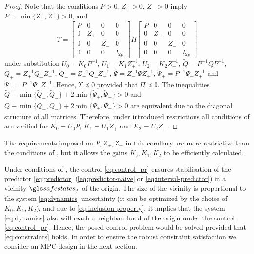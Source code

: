 \begin{proof}
	Note that the conditions $P>0$, $Z_{+}>0$, $Z_{-}>0$ imply $P+\min\{Z_{+},Z_{-}\}>0$,
	and 
	\[
	\Upsilon=\left[\begin{array}{cccc}
	P & 0 & 0 & 0\\
	0 & Z_{+} & 0 & 0\\
	0 & 0 & Z_{-} & 0\\
	0 & 0 & 0 & I_{2p}
	\end{array}\right]\Pi\left[\begin{array}{cccc}
	P & 0 & 0 & 0\\
	0 & Z_{+} & 0 & 0\\
	0 & 0 & Z_{-} & 0\\
	0 & 0 & 0 & I_{2p}
	\end{array}\right]
	\]
	under substitution $U_{0}=K_{0}P^{-1}$, $U_{1}=K_{1}Z_{+}^{-1}$,
	$U_{2}=K_{2}Z_{-}^{-1}$, $\tilde{Q}=P^{-1}QP^{-1}$, $\tilde{Q}_{+}=Z_{+}^{-1}Q_{+}Z_{+}^{-1}$,
	$\tilde{Q}_{-}=Z_{-}^{-1}Q_{-}Z_{-}^{-1}$, $\tilde{\Psi}=Z_{-}^{-1}\Psi Z_{+}^{-1}$,
	$\tilde{\Psi}_{+}=P^{-1}\Psi_{+}Z_{+}^{-1}$ and $\tilde{\Psi}_{-}=P^{-1}\Psi_{-}Z_{-}^{-1}$.
	Hence, $\Upsilon\preceq0$ provided that $\Pi\preceq0$. The inequalities
	$\tilde{Q}+\min\{\tilde{Q}_{+},\tilde{Q}_{-}\}+2\min\{\tilde{\Psi}_{+},\tilde{\Psi}_{-}\}>0$
	and $Q+\min\{Q_{+},Q_{-}\}+2\min\{\Psi_{+},\Psi_{-}\}>0$ are equivalent
	due to the diagonal structure of all matrices. Therefore, under introduced
	restrictions all conditions of  are verified
	for $K_{0}=U_{0}P$, $K_{1}=U_{1}Z_{+}$ and $K_{2}=U_{2}Z_{-}$.
\end{proof}
The requirements imposed on $P,Z_{+},Z_{-}$ in this corollary are
more restrictive than the conditions of ,
but it allows the gains $K_{0},K_{1},K_{2}$ to be efficiently calculated.

Under conditions of , the control \eqref{eq:control_pr} ensures stabilisation of the predictor \eqref{eq:predictor} (\ie \eqref{eq:predictor-naive} or \eqref{eq:interval-predictor}) in a vicinity $\safestates_{f}$ of the origin. The size of the vicinity is proportional to the system \eqref{eq:dynamics} uncertainty (it can be optimized by the choice of $K_{0},K_{1},K_{2}$), and due to \eqref{eq:inclusion-property}, it implies that the system \eqref{eq:dynamics} also will reach a neighbourhood of the origin under the control \eqref{eq:control_pr}. Hence, the posed control problem would be solved provided that \eqref{eq:constraints} holds. In order to ensure the robust constraint satisfaction we consider an \gls{MPC} design in the next section.

